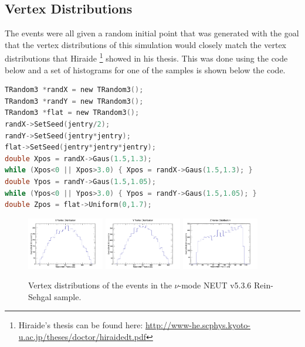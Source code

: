 \documentclass[11pt]{article}
\begin{document}
\subsection{Vertex Distributions}
\label{sub:vertexdistribution}
The events were all given a random initial point that was generated with the goal that the vertex distributions of this simulation would closely match the vertex distributions that Hiraide \footnote{Hiraide's thesis can be found here: \href{http://www-he.scphys.kyoto-u.ac.jp/theses/doctor/hiraide_dt.pdf}{http://www-he.scphys.kyoto-u.ac.jp/theses/doctor/hiraide\textunderscore{}dt.pdf}} showed in his thesis. This was done using the code below and a set of histograms for one of the samples is shown below the code.

\begin{lstlisting}[language=C]
TRandom3 *randX = new TRandom3();
TRandom3 *randY = new TRandom3();
TRandom3 *flat = new TRandom3();
randX->SetSeed(jentry/2);
randY->SetSeed(jentry*jentry);
flat->SetSeed(jentry*jentry*jentry);
double Xpos = randX->Gaus(1.5,1.3);
while (Xpos<0 || Xpos>3.0) { Xpos = randX->Gaus(1.5,1.3); }
double Ypos = randY->Gaus(1.5,1.05);
while (Ypos<0 || Ypos>3.0) { Ypos = randY->Gaus(1.5,1.05); }
double Zpos = flat->Uniform(0,1.7);
\end{lstlisting}


\begin{figure}[H]
\centering
\includegraphics[width=0.3\textwidth]{NewNMReinSehgalImages/4-XVertexDistributionNMRS.png}
\includegraphics[width=0.3\textwidth]{NewNMReinSehgalImages/3-YVertexDistributionNMRS.png}
\includegraphics[width=0.3\textwidth]{NewNMReinSehgalImages/2-ZVertexDistributionNMRS.png}
\caption{Vertex distributions of the events in the $\nu$-mode NEUT v5.3.6 Rein-Sehgal sample.}
\label{fig:app:vertexdistributionRSapp}
\end{figure}
\end{document}
